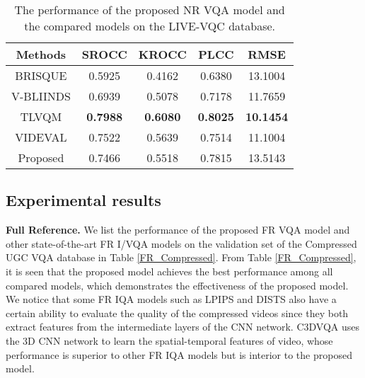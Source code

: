 \documentclass{article}
\begin{document}
\begin{table}
	\small
\centering
	\renewcommand{\arraystretch}{1.15}
	\caption{The performance of the proposed NR VQA model and the compared models on the LIVE-VQC database.}
	\label{NR_LIVE-VQC}
\begin{tabular}{c|cccc}
		\toprule[.15em]
		
		Methods & SROCC & KROCC & PLCC & RMSE   \\
		\hline
		
		BRISQUE \cite{mittal2012no}    &0.5925  &0.4162  & 0.6380  &13.1004  \\
		
		
		V-BLIINDS \cite{saad2014blind}  &0.6939  &0.5078  &0.7178&11.7659 \\
		
		TLVQM \cite{korhonen2019two} & \textbf{0.7988}  &\textbf{0.6080}  &\textbf{0.8025} &\textbf{10.1454}   \\
		
		VIDEVAL \cite{tu2021ugc} &0.7522  &0.5639  &0.7514 &11.1004   \\
		
		
		Proposed    &0.7466 	&0.5518	&0.7815	&13.5143 \\
		
		\bottomrule[.15em]
		
	\end{tabular}	
\vspace{-0.2cm}	
\end{table}


\subsection{Experimental results}
\textbf{Full Reference.}
We list the performance of the proposed FR VQA model and other state-of-the-art FR I/VQA models on the validation set of the Compressed UGC VQA database in Table \ref{FR_Compressed}. From Table \ref{FR_Compressed}, it is seen that the proposed model achieves the best performance among all compared models, which demonstrates the effectiveness of the proposed model. We notice that some FR IQA models such as LPIPS and DISTS also have a certain ability to evaluate the quality of the compressed videos since they both extract features from the intermediate layers of the CNN network. C3DVQA uses the 3D CNN network to learn the spatial-temporal features of video, whose performance is superior to other FR IQA models but is interior to the proposed model. 
\end{document}
